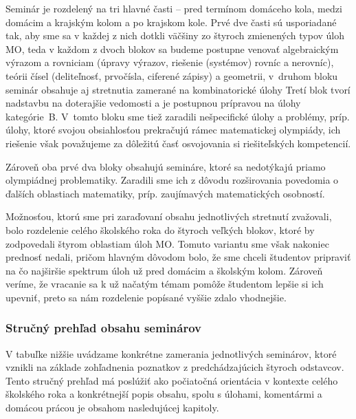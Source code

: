 \documentclass[11pt,a4paper,oneside,final]{book}
\begin{document}
Seminár je rozdelený na tri hlavné časti -- pred termínom domáceho kola, medzi domácim a krajským kolom a po krajskom kole. Prvé dve časti sú usporiadané tak, aby sme sa v každej z nich dotkli väčšiny zo štyroch zmienených typov úloh MO, teda v každom z dvoch blokov sa budeme postupne venovať algebraickým výrazom a rovniciam (úpravy výrazov, riešenie (systémov) rovníc a nerovníc), teórii čísel (deliteľnosť, prvočísla, ciferené zápisy) a geometrii, v~druhom bloku seminár obsahuje aj stretnutia zamerané na kombinatorické úlohy Tretí blok tvorí nadstavbu na doterajšie vedomosti a je postupnou prípravou na úlohy kategórie~B. V~tomto bloku sme tiež zaradili nešpecifické úlohy a problémy, príp. úlohy, ktoré svojou obsiah\-losťou prekračujú rámec matematickej olympiády, ich riešenie však považujeme za dôležitú časť osvojovania si riešiteľských kompetencií.

Zároveň oba prvé dva bloky obsahujú semináre, ktoré sa nedotýkajú priamo olympiádnej problematiky. Zaradili sme ich z dôvodu rozširovania povedomia o ďalších oblastiach matematiky, príp. zaujímavých matematických osobností.

Možnosťou, ktorú sme pri zaraďovaní obsahu jednotlivých stretnutí zvažovali, bolo rozdelenie celého školského roka do štyroch veľkých blokov, ktoré by zodpovedali  štyrom oblastiam úloh MO. Tomuto variantu sme však nakoniec prednosť nedali, pričom hlavným dôvodom bolo, že sme chceli študentov pripraviť na čo najširšie spektrum úloh už pred domácim a školským kolom. Zároveň veríme, že vracanie sa k už načatým témam pomôže študentom lepšie si ich upevniť, preto sa nám rozdelenie popísané vyššie zdalo vhodnejšie.

\subsubsection*{Stručný prehľad obsahu seminárov}

V tabuľke nižšie uvádzame konkrétne zamerania jednotlivých seminárov, ktoré vznikli na základe zohľadnenia poznatkov z predchádzajúcich štyroch odstavcov. Tento stručný prehľad má poslúžiť ako počiatočná orientácia v kontexte celého školského roka a konkrétnejší popis obsahu, spolu s úlohami, komentármi a domácou prácou je obsahom nasledujúcej kapitoly.
\end{document}
